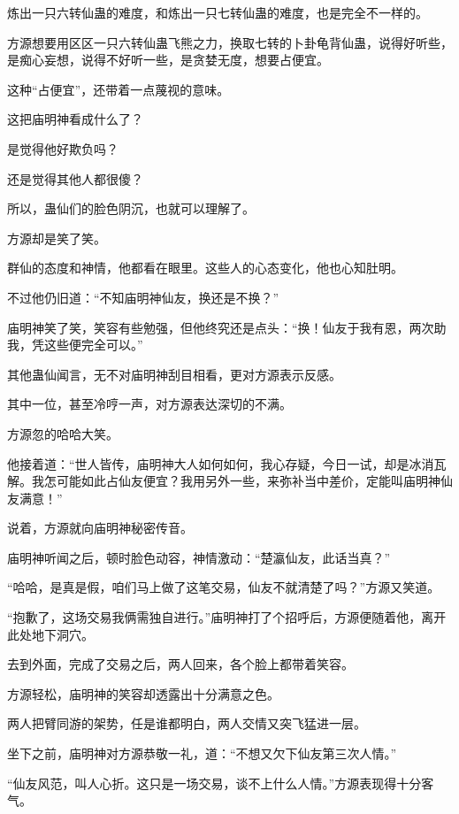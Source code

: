 
\begin{this_body}

炼出一只六转仙蛊的难度，和炼出一只七转仙蛊的难度，也是完全不一样的。

方源想要用区区一只六转仙蛊飞熊之力，换取七转的卜卦龟背仙蛊，说得好听些，是痴心妄想，说得不好听一些，是贪婪无度，想要占便宜。

这种“占便宜”，还带着一点蔑视的意味。

这把庙明神看成什么了？

是觉得他好欺负吗？

还是觉得其他人都很傻？

所以，蛊仙们的脸色阴沉，也就可以理解了。

方源却是笑了笑。

群仙的态度和神情，他都看在眼里。这些人的心态变化，他也心知肚明。

不过他仍旧道：“不知庙明神仙友，换还是不换？”

庙明神笑了笑，笑容有些勉强，但他终究还是点头：“换！仙友于我有恩，两次助我，凭这些便完全可以。”

其他蛊仙闻言，无不对庙明神刮目相看，更对方源表示反感。

其中一位，甚至冷哼一声，对方源表达深切的不满。

方源忽的哈哈大笑。

他接着道：“世人皆传，庙明神大人如何如何，我心存疑，今日一试，却是冰消瓦解。我怎可能如此占仙友便宜？我用另外一些，来弥补当中差价，定能叫庙明神仙友满意！”

说着，方源就向庙明神秘密传音。

庙明神听闻之后，顿时脸色动容，神情激动：“楚瀛仙友，此话当真？”

“哈哈，是真是假，咱们马上做了这笔交易，仙友不就清楚了吗？”方源又笑道。

“抱歉了，这场交易我俩需独自进行。”庙明神打了个招呼后，方源便随着他，离开此处地下洞穴。

去到外面，完成了交易之后，两人回来，各个脸上都带着笑容。

方源轻松，庙明神的笑容却透露出十分满意之色。

两人把臂同游的架势，任是谁都明白，两人交情又突飞猛进一层。

坐下之前，庙明神对方源恭敬一礼，道：“不想又欠下仙友第三次人情。”

“仙友风范，叫人心折。这只是一场交易，谈不上什么人情。”方源表现得十分客气。


\end{this_body}
